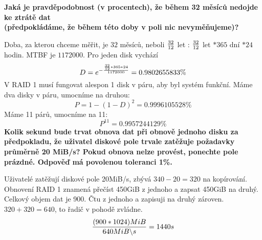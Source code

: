 \textbf{Jaká je pravděpodobnost (v procentech), že během 32 měsíců nedojde ke ztrátě dat \\(předpokládáme, že během této doby v poli nic nevyměňujeme)?}

Doba, za kterou chceme měřit, je $32$ měsíců, neboli ${32 \over 12}$ let : ${32 \over 12}$ let $* 365$ dní $* 24$ hodin. MTBF je $1 172 000$. 
Pro jeden disk vychází $$D = e^{-{{32 \over 12}*365*24 \over 1172000}} =  0.9802655833\%$$
V RAID 1 musí fungovat alespon 1 disk v páru, aby byl systém funkční.
Máme dva disky v páru, umocníme na druhou:
$$P = 1 - (1 - D)^2 = 0.9996105528\%$$
Máme 11 párů, umocníme na 11:
$$P^{11} = 0.9957244129\%$$
\textbf{Kolik sekund bude trvat obnova dat při obnově jednoho disku za předpokladu, že uživatel diskové pole trvale zatěžuje požadavky průměrně 20 MiB/s? Pokud obnova nelze provést, ponechte pole prázdné. Odpověď má povolenou toleranci 1\%.}

Uživatelé zatěžují diskové pole 20MiB/s, zbývá $340-20=320$ na kopírování.
Obnovení RAID 1 znamená přečíst 450GiB z jednoho a zapsat 450GiB na druhý. Celkový objem dat je 900. Čtu z jednoho a zapisuji na druhý zároven. $320+320 = 640$, to řadič v pohodě zvládne.
$${{(900 * 1024)MiB} \over 640 MiB\backslash s} = 1440s$$